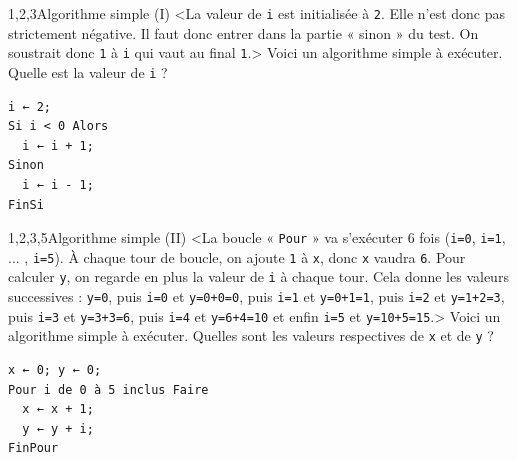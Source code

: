 \begin{quiz}[title={Instructions élémentaires}]
\begin{quizquestion*}[b]{4}{1,2,3}{Algorithme simple (I)}
<La valeur de \texttt{i} est initialisée à \texttt{2}. Elle n'est donc pas strictement négative. Il faut donc entrer dans la partie « sinon » du test. On soustrait donc \texttt{1} à \texttt{i} qui vaut au final \texttt{1}.>
Voici un algorithme simple à exécuter. Quelle est la valeur de \texttt{i} ?
\begin{lstlisting}[style=lstalgostyle]
i ← 2;
Si i < 0 Alors
  i ← i + 1;
Sinon
  i ← i - 1;
FinSi
\end{lstlisting}
\end{quizquestion*}

\begin{quizquestion*}[b]{4}{1,2,3,5}{Algorithme simple (II)}
<La boucle « \texttt{Pour} » va s'exécuter 6 fois (\texttt{i=0}, \texttt{i=1}, ... , \texttt{i=5}). À chaque tour de boucle, on ajoute \texttt{1} à \texttt{x}, donc \texttt{x} vaudra \texttt{6}.
Pour calculer \texttt{y}, on regarde en plus la valeur de \texttt{i} à chaque tour. Cela donne les valeurs successives : \texttt{y=0}, puis \texttt{i=0} et \texttt{y=0+0=0}, puis \texttt{i=1} et \texttt{y=0+1=1}, puis \texttt{i=2} et \texttt{y=1+2=3}, puis \texttt{i=3} et \texttt{y=3+3=6}, puis \texttt{i=4} et \texttt{y=6+4=10} et enfin \texttt{i=5} et \texttt{y=10+5=15}.>
Voici un algorithme simple à exécuter. Quelles sont les valeurs respectives de \texttt{x} et de \texttt{y} ?	
\begin{lstlisting}[style=lstalgostyle]
x ← 0; y ← 0;
Pour i de 0 à 5 inclus Faire
  x ← x + 1;
  y ← y + i;
FinPour
\end{lstlisting}
\end{quizquestion*}


\end{quiz}
